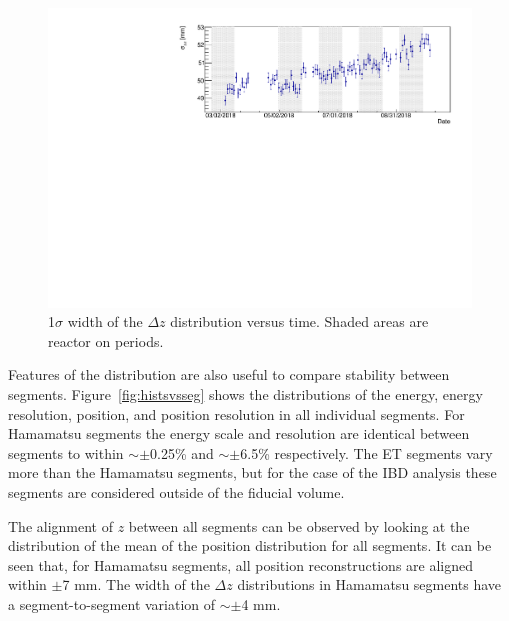 \begin{figure}[h]
	\centering
	\includegraphics[width=0.9\linewidth]{tex/6-ac227-images/DetPerformance/RnPoDzSigmaVsTime}
	\caption{1$\sigma$ width of the $\Delta z$ distribution versus time. Shaded areas are reactor on periods.}
	\label{fig:rnpodzsigmavstime}
\end{figure}

Features of the \Po distribution are also useful to compare stability between segments. 
Figure~\ref{fig:histsvsseg} shows the distributions of the \Po energy, energy resolution, position, and position resolution in all individual segments. 
For Hamamatsu segments the energy scale and resolution are identical between segments to within $\sim \pm$0.25\% and $\sim \pm$6.5\% respectively. 
The ET segments vary more than the Hamamatsu segments, but for the case of the IBD analysis these segments are considered outside of the fiducial volume.

The alignment of $z$ between all segments can be observed by looking at the distribution of the mean of the position distribution for all segments.
It can be seen that, for Hamamatsu segments, all position reconstructions are aligned within $\pm$7 mm. 
The width of the $\Delta z$ distributions in Hamamatsu segments have a segment-to-segment variation of $\sim \pm$4 mm.

